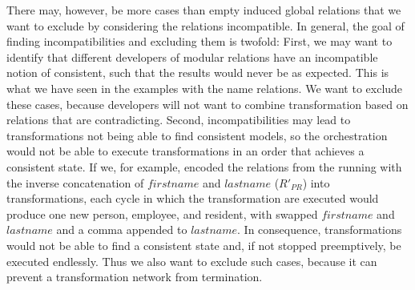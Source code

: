 There may, however, be more cases than empty induced global relations that we want to exclude by considering the relations incompatible.
In general, the goal of finding incompatibilities and excluding them is twofold:
First, we may want to identify that different developers of modular relations have an incompatible notion of consistent, such that the results would never be as expected.
This is what we have seen in the examples with the name relations.
We want to exclude these cases, because developers will not want to combine transformation based on relations that are contradicting.
Second, incompatibilities may lead to transformations not being able to find consistent models, so the orchestration would not be able to execute transformations in an order that achieves a consistent state.
If we, for example, encoded the relations from the running with the inverse concatenation of $firstname$ and $lastname$ ($R'_{PR}$) into transformations, each cycle in which the transformation are executed would produce one new person, employee, and resident, with swapped $firstname$ and $lastname$ and a comma appended to $lastname$.
In consequence, transformations would not be able to find a consistent state and, if not stopped preemptively, be executed endlessly.
Thus we also want to exclude such cases, because it can prevent a transformation network from termination.

